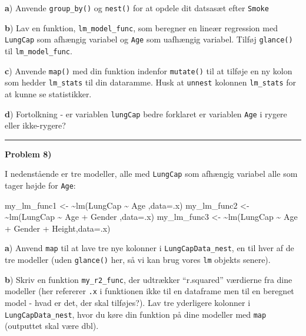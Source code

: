 \documentclass[
]{book}
\newenvironment{Shaded}{\begin{snugshade}}{\end{snugshade}}
\newcommand{\AttributeTok}[1]{\textcolor[rgb]{0.77,0.63,0.00}{#1}}
\newcommand{\ErrorTok}[1]{\textcolor[rgb]{0.64,0.00,0.00}{\textbf{#1}}}
\newcommand{\FunctionTok}[1]{\textcolor[rgb]{0.00,0.00,0.00}{#1}}
\newcommand{\NormalTok}[1]{#1}
\newcommand{\OtherTok}[1]{\textcolor[rgb]{0.56,0.35,0.01}{#1}}
\newcommand{\SpecialCharTok}[1]{\textcolor[rgb]{0.00,0.00,0.00}{#1}}
\begin{document}
\textbf{a}) Anvende \texttt{group\_by()} og \texttt{nest()} for at opdele dit datsasæt efter \texttt{Smoke}

\textbf{b}) Lav en funktion, \texttt{lm\_model\_func}, som beregner en lineær regression med \texttt{LungCap} som afhængig variabel og \texttt{Age} som uafhængig variabel. Tilføj \texttt{glance()} til \texttt{lm\_model\_func}.

\textbf{c}) Anvende \texttt{map()} med din funktion indenfor \texttt{mutate()} til at tilføje en ny kolon som hedder \texttt{lm\_stats} til din dataramme. Husk at \texttt{unnest} kolonnen \texttt{lm\_stats} for at kunne se statistikker.

\textbf{d}) Fortolkning - er variablen \texttt{lungCap} bedre forklaret er variablen \texttt{Age} i rygere eller ikke-rygere?

\begin{center}\rule{0.5\linewidth}{0.5pt}\end{center}

\textbf{Problem 8)}

I nedenstående er tre modeller, alle med \texttt{LungCap} som afhængig variabel alle som tager højde for \texttt{Age}:

\begin{Shaded}
\begin{Highlighting}[]
\NormalTok{my\_lm\_func1 }\OtherTok{\textless{}{-}}  \ErrorTok{\textasciitilde{}}\FunctionTok{lm}\NormalTok{(LungCap }\SpecialCharTok{\textasciitilde{}}\NormalTok{ Age                  ,}\AttributeTok{data=}\NormalTok{.x)}
\NormalTok{my\_lm\_func2 }\OtherTok{\textless{}{-}}  \ErrorTok{\textasciitilde{}}\FunctionTok{lm}\NormalTok{(LungCap }\SpecialCharTok{\textasciitilde{}}\NormalTok{ Age }\SpecialCharTok{+}\NormalTok{ Gender         ,}\AttributeTok{data=}\NormalTok{.x)}
\NormalTok{my\_lm\_func3 }\OtherTok{\textless{}{-}}  \ErrorTok{\textasciitilde{}}\FunctionTok{lm}\NormalTok{(LungCap }\SpecialCharTok{\textasciitilde{}}\NormalTok{ Age }\SpecialCharTok{+}\NormalTok{ Gender }\SpecialCharTok{+}\NormalTok{ Height,}\AttributeTok{data=}\NormalTok{.x)}
\end{Highlighting}
\end{Shaded}

\textbf{a}) Anvend \texttt{map} til at lave tre nye kolonner i \texttt{LungCapData\_nest}, en til hver af de tre modeller (uden \texttt{glance()} her, så vi kan brug vores \texttt{lm} objekts senere).

\textbf{b}) Skriv en funktion \texttt{my\_r2\_func}, der udtrækker ``r.squared'' værdierne fra dine modeller (her refererer \texttt{.x} i funktionen ikke til en dataframe men til en beregnet model - hvad er det, der skal tilføjes?). Lav tre yderligere kolonner i \texttt{LungCapData\_nest}, hvor du køre din funktion på dine modeller med \texttt{map} (outputtet skal være dbl).
\end{document}

